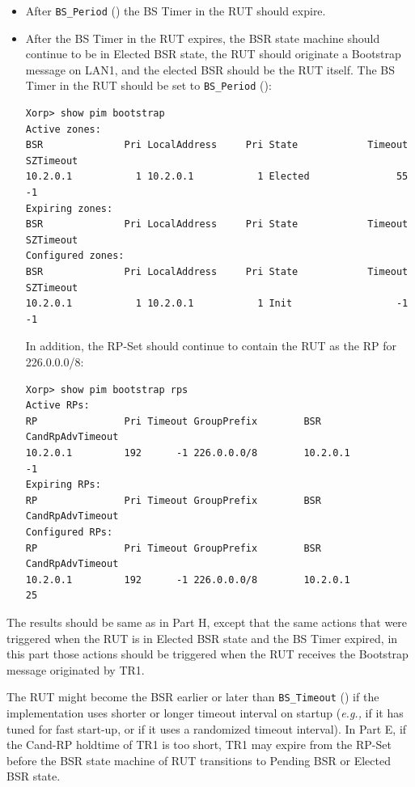 \documentclass[11pt]{report}
\newcommand{\eg}{\emph{e.g.,}\xspace}
\begin{document}
\begin{itemize}
  \item After \verb=BS_Period= ({\PimsmBSPeriod}) the BS Timer
  in the RUT should expire.

  \item After the BS Timer in the RUT expires, the BSR state machine should
  continue to be in Elected BSR state, the RUT should originate a Bootstrap
  message on LAN1, and the elected BSR should be the RUT itself.
  The BS Timer in the RUT should be set to \verb=BS_Period=
  ({\PimsmBSPeriod}):

\begin{verbatim}
Xorp> show pim bootstrap 
Active zones:
BSR              Pri LocalAddress     Pri State            Timeout SZTimeout
10.2.0.1           1 10.2.0.1           1 Elected               55        -1
Expiring zones:
BSR              Pri LocalAddress     Pri State            Timeout SZTimeout
Configured zones:
BSR              Pri LocalAddress     Pri State            Timeout SZTimeout
10.2.0.1           1 10.2.0.1           1 Init                  -1        -1
\end{verbatim}

  In addition, the RP-Set should continue to contain the RUT as the RP for
  226.0.0.0/8:

\begin{verbatim}
Xorp> show pim bootstrap rps 
Active RPs:
RP               Pri Timeout GroupPrefix        BSR         CandRpAdvTimeout
10.2.0.1         192      -1 226.0.0.0/8        10.2.0.1                  -1
Expiring RPs:
RP               Pri Timeout GroupPrefix        BSR         CandRpAdvTimeout
Configured RPs:
RP               Pri Timeout GroupPrefix        BSR         CandRpAdvTimeout
10.2.0.1         192      -1 226.0.0.0/8        10.2.0.1                  25
\end{verbatim}

\end{itemize}


The results should be same as in Part H, except that the same actions that
were triggered when the RUT is in Elected BSR state and the BS Timer expired,
in this part those actions should be triggered when the RUT receives the
Bootstrap message originated by TR1.

The RUT might become the BSR earlier or later than \verb=BS_Timeout=
({\PimsmBSTimeout}) if the implementation uses shorter or longer timeout
interval on startup (\eg if it has tuned for fast start-up, or if it uses a
randomized timeout interval).
In Part E, if the Cand-RP holdtime of TR1 is too short, TR1 may expire from
the RP-Set before the BSR state machine of RUT transitions to Pending BSR or
Elected BSR state.
\end{document}
